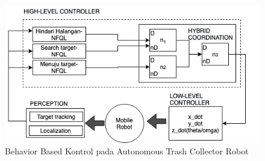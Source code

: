  \begin{figure}[H]
 	\centering
 	\includegraphics[width=5.5in]{figure/NFQL-BBR-AMR}
 	\caption{Behavior Based Kontrol pada Autonomous Trash Collector Robot}
 	\label{fig:NFQL_BBR_AMR}
 \end{figure}
 











